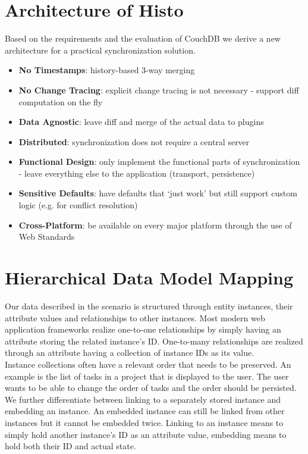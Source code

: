 
\section{Architecture of Histo}
\label{sec:main.histo}

Based on the requirements and the evaluation of CouchDB we derive a new architecture for a practical synchronization solution.

\begin{itemize}
\item
  \textbf{No Timestamps}: history-based 3-way merging
\item
  \textbf{No Change Tracing}: explicit change tracing is not necessary - support
  diff computation on the fly
\item
  \textbf{Data Agnostic}: leave diff and merge of the actual data to
  plugins
\item
  \textbf{Distributed}: synchronization does not require a central server
\item
  \textbf{Functional Design}: only implement the functional parts of synchronization - leave everything else to the application (transport, persistence)
\item
  \textbf{Sensitive Defaults}: have defaults that `just work' but
  still support custom logic (e.g. for conflict resolution)
\item
  \textbf{Cross-Platform}: be available on every major platform through the use of Web Standards
\end{itemize}

\section{Hierarchical Data Model Mapping}
Our data described in the scenario is structured through entity instances, their attribute values and relationships to other instances.
Most modern web application frameworks realize one-to-one relationships by simply having an attribute storing the related instance's ID.
One-to-many relationships are realized through an attribute having a collection of 
instance IDs as its value.\\
Instance collections often have a relevant order that needs to be preserved.
An example is the list of tasks in a project that is displayed to the user.
The user wants to be able to change the order of tasks and the order should be persisted.\\
We further differentiate between linking to a separately stored instance and  embedding an instance.
An embedded instance can still be linked from other instances but it cannot be embedded twice.
Linking to an instance means to simply hold another instance's ID as an attribute value, embedding means to hold both their ID and actual state.\\

